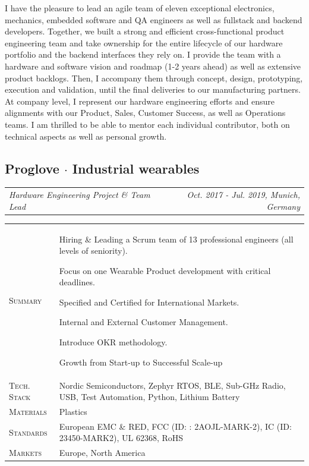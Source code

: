 \documentclass[10pt,a4paper]{moderncv}
\newcommand*{\makecareersubsection}[5]{
  \subsection{#1 {\color{color2}$\cdot$ #2}}
  \addvspace{-0.5em}
  {\color{color2}
  \begin{tabularx}{\textwidth}{LR}
    {\itshape #3} & {\itshape #4, #5}
  \end{tabularx}}
  \par\addvspace{1em}
  }
\begin{document}
  \vspace{1.5em}

  I have the pleasure to lead an agile team of eleven exceptional electronics, mechanics, embedded software and QA engineers as well as fullstack and backend developers. Together, we built a strong and efficient cross-functional product engineering team and take ownership for the entire lifecycle of our hardware portfolio and the backend interfaces they rely on. I provide the team with a hardware and software vision and roadmap (1-2 years ahead) as well as extensive product backlogs. Then, I accompany them through concept, design, prototyping, execution and validation, until the final deliveries to our manufacturing partners. At company level, I represent our hardware engineering efforts and ensure alignments with our Product, Sales, Customer Success, as well as Operations teams. I am thrilled to be able to mentor each individual contributor, both on technical aspects as well as personal growth.

\vspace{0.75em}

\makecareersubsection{Proglove}{Industrial wearables}
  {Hardware Engineering Project \& Team Lead}
  {Oct. 2017 - Jul. 2019}
  {Munich, Germany}

  \begin{tabularx}{\textwidth}{>{\scshape}l@{\hskip 3.5mm}L}
    Summary & Hiring \& Leading a Scrum team of 13 professional engineers (all levels of seniority).
    \par Focus on one Wearable Product development with critical deadlines.
    \par Specified and Certified for International Markets.
    \par Internal and External Customer Management. 
    \par Introduce OKR methodology.
    \par Growth from Start-up to Successful Scale-up\\
    Tech. Stack & Nordic Semiconductors, Zephyr RTOS, BLE, Sub-GHz Radio, USB, Test Automation, Python, Lithium Battery\\
    Materials & Plastics\\
    Standards & European EMC \& RED, FCC (ID: : 2AOJL-MARK-2), IC (ID: 23450-MARK2), UL 62368, RoHS\\
    Markets & Europe, North America\\
  \end{tabularx}
\end{document}
